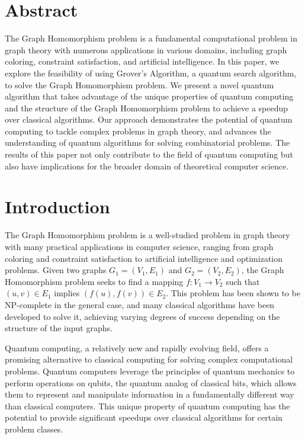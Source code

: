 \section{Abstract}

The Graph Homomorphism problem is a fundamental computational problem in graph theory with numerous applications in various domains, including graph coloring, constraint satisfaction, and artificial intelligence. In this paper, we explore the feasibility of using Grover's Algorithm, a quantum search algorithm, to solve the Graph Homomorphism problem. We present a novel quantum algorithm that takes advantage of the unique properties of quantum computing and the structure of the Graph Homomorphism problem to achieve a speedup over classical algorithms. Our approach demonstrates the potential of quantum computing to tackle complex problems in graph theory, and advances the understanding of quantum algorithms for solving combinatorial problems. The results of this paper not only contribute to the field of quantum computing but also have implications for the broader domain of theoretical computer science.

\section{Introduction}

The Graph Homomorphism problem is a well-studied problem in graph theory with many practical applications in computer science, ranging from graph coloring and constraint satisfaction to artificial intelligence and optimization problems. Given two graphs $G_1 = (V_1, E_1)$ and $G_2 = (V_2, E_2)$, the Graph Homomorphism problem seeks to find a mapping $f: V_1 \rightarrow V_2$ such that $(u, v) \in E_1$ implies $(f(u), f(v)) \in E_2$. This problem has been shown to be NP-complete in the general case, and many classical algorithms have been developed to solve it, achieving varying degrees of success depending on the structure of the input graphs.

Quantum computing, a relatively new and rapidly evolving field, offers a promising alternative to classical computing for solving complex computational problems. Quantum computers leverage the principles of quantum mechanics to perform operations on qubits, the quantum analog of classical bits, which allows them to represent and manipulate information in a fundamentally different way than classical computers. This unique property of quantum computing has the potential to provide significant speedups over classical algorithms for certain problem classes.

